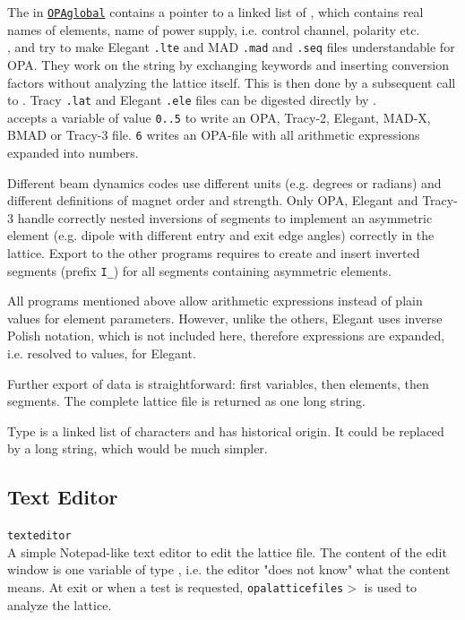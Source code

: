 \documentclass[12pt]{article}
\newcommand\code[1]{{\tt #1}}
\newcommand{\unico}[1]{{\color{burntorange}\code{#1}}}
\newcommand{\prcod}[2]{\opauni{#1}$>$\unico{#2}}
\newcommand{\opagui}[1]{\colorbox{blue!20}{\code{#1}}}
\newcommand{\oguih}[2]{\subsection{\label{#2}#1}{\Huge\opagui{#2}}\\}
\newcommand{\opauni}[1]{\colorbox{orange!30}{\code{#1}}}
\newcommand{\ouni}[1]{\hyperref[#1]{\opauni{#1}}}
\newcommand{\desc}[1]{#1}
\newcommand{\todo}[1]{{\color{red} #1}}
\begin{document}
{The \unico{ElementType} in \ouni{OPAglobal} contains a pointer to a linked list of \unico{NameListType},  which contains real names of elements, name of power supply, i.e. control channel, polarity etc. \\


\unico{lteconvert}, \unico{madconvert} and \unico{madseqconvert} try to make Elegant \code{*.lte} and MAD \code{*.mad} and \code{*.seq} files understandable for OPA. They work on the \unico{TextBuffer} string by exchanging keywords and inserting conversion factors without analyzing the lattice itself. This is then done by a subsequent call to \unico{LatRead}. Tracy \code{*.lat} and Elegant \code{*.ele} files can be digested directly by \unico{LatRead}.\\

\unico{WriteLattice} accepts a variable \unico{mode} of value \code{0..5} to write an OPA, Tracy-2, Elegant, MAD-X, BMAD or Tracy-3 file. \unico{mode} \code{6} writes an OPA-file with all arithmetic expressions expanded into numbers.

Different beam dynamics codes use different units (e.g. degrees or radians) and different definitions of magnet order and strength. Only OPA, Elegant and Tracy-3 handle correctly nested inversions of segments to implement an asymmetric element (e.g. dipole with different entry and exit edge angles) correctly in the lattice. Export to the other programs requires to create and insert inverted segments (prefix \code{I\_}) for all segments containing asymmetric elements.

All  programs mentioned above allow arithmetic expressions instead of plain values for element parameters. However, unlike the others, Elegant uses inverse Polish notation, which is not included here, therefore expressions are expanded, i.e. resolved to values, for Elegant.

Further export of data is straightforward: first variables, then elements, then segments. The complete lattice file is returned as one long string.
}

\todo{Type \unico{TextBuffer} is a linked list of characters and has historical origin. It could be replaced by a long string, which would be much simpler.}

\oguih{Text Editor}{texteditor} 
\desc{A simple Notepad-like text editor to edit the lattice file. The content of the edit window is one variable of type \unico{textbuffer}, i.e. the editor "does not know" what the content means. At exit or when a test is requested, \prcod{opalatticefiles}{LatRead} is used to analyze the lattice.}
\end{document}
